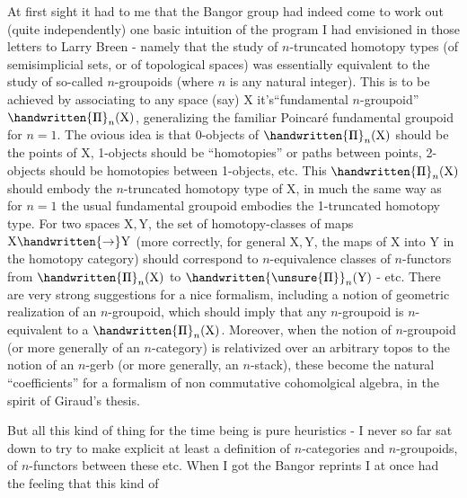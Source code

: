 At first sight it had  to me that the Bangor group had indeed come to work out (quite independently) one basic intuition of the program I had envisioned in those letters to Larry Breen - namely that the study of $n$-truncated homotopy types (of semisimplicial sets, or of topological spaces) was essentially equivalent to the study of so-called $n$-groupoids (where $n$ is any natural integer). This is  to be achieved by associating to any space (say) $\mathrm{X}$ it's``fundamental $n$-groupoid'' $\handwritten{\mathbb{\mathord{\rlap{\kern.23em\vrule height .66em width .035em}\mathrm{\Pi}}}}_{n}(\mathrm{X})$, generalizing the familiar Poincaré fundamental groupoid for $n=1$. The ovious idea is that 0-objects of $\handwritten{\mathbb{\mathord{\rlap{\kern.23em\vrule height .66em width .035em}\mathrm{\Pi}}}}_{n}(\mathrm{X})$ should be the points of $\mathrm{X}$, 1-objects should be ``homotopies'' or paths between points, 2-objects should be homotopies between 1-objects, etc.\unsure{-} This $\handwritten{\mathbb{\mathord{\rlap{\kern.23em\vrule height .66em width .035em}\mathrm{\Pi}}}}_{n}(\mathrm{X})$ should embody the $n$-truncated homotopy type of $\mathrm{X}$, in much the same way as for $n=1$ the usual fundamental groupoid embodies the 1-truncated homotopy type. For two spaces $\mathrm{X},\mathrm{Y}$, the set of homotopy-classes of maps $\mathrm{X}\handwritten{\to}\mathrm{Y}$ (more correctly, for general $\mathrm{X},\mathrm{Y}$, the maps of $\mathrm{X}$ into $\mathrm{Y}$ in the homotopy category) should correspond to $n$-equivalence classes of $n$-functors from $\handwritten{\mathbb{\mathord{\rlap{\kern.23em\vrule height .66em width .035em}\mathrm{\Pi}}}}_{n}(\mathrm{X})$ to $\handwritten{\unsure{\mathbb{\mathord{\rlap{\kern.23em\vrule height .66em width .035em}\mathrm{\Pi}}}}}_{n}(\mathrm{Y})$ - etc. There are very stro\unsure{-}ng suggestions for a nice formalism, including a notion of geometric realization of an $n$-groupoid, which should imply that any $n$-groupoid is $n$-equivalent to a $\handwritten{\mathbb{\mathord{\rlap{\kern.23em\vrule height .66em width .035em}\mathrm{\Pi}}}}_{n}(\mathrm{X})$. Moreover, when the notion of $n$-groupoid (or more generally of an $n$-category) is relativized over an arbitrary topos to the notion of an $n$-gerb (or more generally, an $n$-stack), these become the  natural ``coefficients'' for a formalism of non commutative cohomolgical algebra, in the spirit of Giraud's thesis.

But all this kind of thing for the time being is pure heuristics - I never so far sat down to try to make explicit at least a definition of $n$-categories and $n$-groupoids, of $n$-functors between these etc. When I got the Bangor reprints I at once had the feeling that this kind of 
